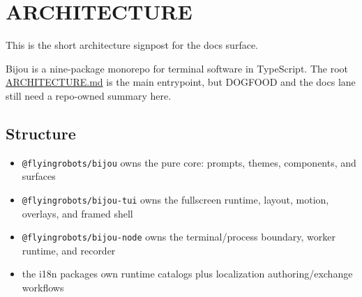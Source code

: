 \chapter{ARCHITECTURE}\label{record-002}

\smallskip

This is the short architecture signpost for the docs surface.

Bijou is a nine-package monorepo for terminal software in TypeScript. The root \href{https://github.com/flyingrobots/bijou/blob/cbd70612140e7a450d764b3c7be1c6af878b99bc/ARCHITECTURE.md}{ARCHITECTURE.md} is the main entrypoint, but DOGFOOD and the docs lane still need a repo-owned summary here.

\section{Structure}\label{record-002-structure}

\begin{itemize}
\tightlist
\item
  \texttt{@\allowbreak{}f\allowbreak{}l\allowbreak{}y\allowbreak{}i\allowbreak{}n\allowbreak{}g\allowbreak{}r\allowbreak{}o\allowbreak{}b\allowbreak{}o\allowbreak{}t\allowbreak{}s\allowbreak{}/\allowbreak{}b\allowbreak{}i\allowbreak{}j\allowbreak{}o\allowbreak{}u} owns the pure core: prompts, themes, components, and surfaces
\item
  \texttt{@\allowbreak{}f\allowbreak{}l\allowbreak{}y\allowbreak{}i\allowbreak{}n\allowbreak{}g\allowbreak{}r\allowbreak{}o\allowbreak{}b\allowbreak{}o\allowbreak{}t\allowbreak{}s\allowbreak{}/\allowbreak{}b\allowbreak{}i\allowbreak{}j\allowbreak{}o\allowbreak{}u\allowbreak{}-\allowbreak{}t\allowbreak{}u\allowbreak{}i} owns the fullscreen runtime, layout, motion, overlays, and framed shell
\item
  \texttt{@\allowbreak{}f\allowbreak{}l\allowbreak{}y\allowbreak{}i\allowbreak{}n\allowbreak{}g\allowbreak{}r\allowbreak{}o\allowbreak{}b\allowbreak{}o\allowbreak{}t\allowbreak{}s\allowbreak{}/\allowbreak{}b\allowbreak{}i\allowbreak{}j\allowbreak{}o\allowbreak{}u\allowbreak{}-\allowbreak{}n\allowbreak{}o\allowbreak{}d\allowbreak{}e} owns the terminal/process boundary, worker runtime, and recorder
\item
  the i18n packages own runtime catalogs plus localization authoring/exchange workflows
\end{itemize}

